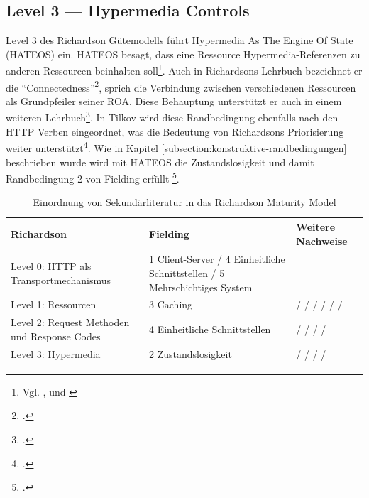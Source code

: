 \subsection{Level 3 — Hypermedia Controls}\label{subsection:level-3}

Level 3 des Richardson Gütemodells führt Hypermedia As The Engine Of State (HATEOS) ein. HATEOS besagt, dass eine Ressource Hypermedia-Referenzen zu anderen Ressourcen beinhalten soll\footnote{Vgl. \cite[Vgl. ][]{fowler_richardson_2010}, \cite[Vgl. ][]{richardson_justice_2008} und \cite[Vgl. ][S. 5]{pautasso_restful_2014}}. Auch in Richardsons Lehrbuch bezeichnet er die “Connectedness”\footcite[Vgl. ][S. 105]{richardson_restful_2007}, sprich die Verbindung zwischen verschiedenen Ressourcen als Grundpfeiler seiner ROA. Diese Behauptung unterstützt er auch in einem weiteren Lehrbuch\footcite[Vgl. ][S. XV]{richardson_restful_2013}. In Tilkov wird diese Randbedingung ebenfalls nach den HTTP Verben eingeordnet, was die Bedeutung von Richardsons Priorisierung weiter unterstützt\footcite[Vgl. ][S. 75]{tilkov_rest_2015}. Wie in Kapitel \ref{subsection:konstruktive-randbedingungen} beschrieben wurde wird mit HATEOS die Zustandslosigkeit und damit Randbedingung 2 von Fielding erfüllt \footcite[Vgl. ][S. 75]{tilkov_rest_2015}. 

\begin{table}
\footnotesize
\begin{tabular}{p{3cm}|p{6cm}|p{6cm}}
    \textbf{Richardson} & \textbf{Fielding} & \textbf{Weitere Nachweise} \\
    \hline
    Level 0: HTTP als Transportmechanismus & 1 Client-Server / 4 Einheitliche Schnittstellen / 5 Mehrschichtiges System  & \cite{fielding_architectural_2000} \\
    \hline
    Level 1: Ressourcen & 3 Caching & \cite{fowler_richardson_2010} / \cite[S. 79]{richardson_restful_2007} / \cite{berners-lee_univeral_1996} / \cite[S. 105]{richardson_restful_2007} / \cite[S. 40]{tilkov_rest_2015} \cite{megginson_rest_2007} / \cite[S. 3]{pautasso_restful_2014} / \cite{fielding_hypertext_1999} \\
    \hline
    Level 2: Request Methoden und Response Codes & 4 Einheitliche Schnittstellen  & \cite[S. 15]{pautasso_rest_2009} / \cite[S. 237]{franch_detection_2014} / \cite[S. 23]{masse_rest_2012} / \cite[S. 53]{tilkov_rest_2015} / \cite{richardson_restful_2007} \\
    \hline
    Level 3: Hypermedia & 2 Zustandslosigkeit  & \cite{fowler_richardson_2010} / \cite{richardson_justice_2008} / \cite{pautasso_restful_2014} / \cite{richardson_restful_2007} / \cite{tilkov_rest_2015}  \\
\end{tabular}
\caption{Einordnung von Sekundärliteratur in das Richardson Maturity Model}
\label{tab:EinordnungRichardson}
\end{table}


